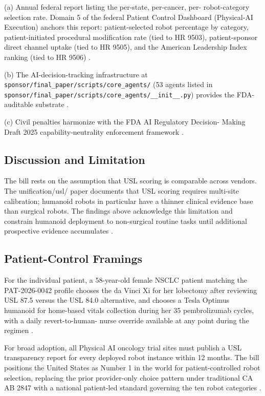 (a) Annual federal report listing the per-state, per-cancer, per-
robot-category selection rate. Domain 5 of the federal Patient
Control Dashboard (Physical-AI Execution) anchors this report:
patient-selected robot percentage by category, patient-initiated
procedural modification rate (tied to HR 9503), patient-sponsor
direct channel uptake (tied to HR 9505), and the American Leadership
Index ranking (tied to HR 9506) \cite{kawchak_2026_18810541,
kawchak_2026_18778219, kawchak_2026_19244918}.

(b) The AI-decision-tracking infrastructure at
\texttt{sponsor/final\_paper/scripts/core\_agents/} (53 agents listed
in
\texttt{sponsor/final\_paper/scripts/core\_agents/\_\_init\_\_.py})
provides the FDA-auditable substrate \cite{kawchak_2026_19396256}.

(c) Civil penalties harmonize with the FDA AI Regulatory Decision-
Making Draft 2025 capability-neutrality enforcement framework
\cite{fda_ai_regulatory_decision_draft_2025}.

\subsection{Discussion and Limitation}

The bill rests on the assumption that USL scoring is comparable
across vendors. The unification/usl/ paper documents that USL scoring
requires multi-site calibration; humanoid robots in particular have
a thinner clinical evidence base than surgical robots. The findings
above acknowledge this limitation and constrain humanoid deployment
to non-surgical routine tasks until additional prospective evidence
accumulates \cite{kawchak_2026_18778219}.

\subsection{Patient-Control Framings}

For the individual patient, a 58-year-old female NSCLC patient
matching the PAT-2026-0042 profile chooses the da Vinci Xi for her
lobectomy after reviewing USL 87.5 versus the USL 84.0 alternative,
and chooses a Tesla Optimus humanoid for home-based vitals collection
during her 35 pembrolizumab cycles, with a daily revert-to-human-
nurse override available at any point during the regimen
\cite{dronca2026cancer_care_beyond_walls, kawchak_2026_19119939}.

For broad adoption, all Physical AI oncology trial sites must
publish a USL transparency report for every deployed robot instance
within 12 months. The bill positions the United States as Number 1
in the world for patient-controlled robot selection, replacing the
prior provider-only choice pattern under traditional CA AB 2847 with
a national patient-led standard governing the ten robot categories
\cite{kawchak_2026_18810541, kawchak_2026_19176370}.
